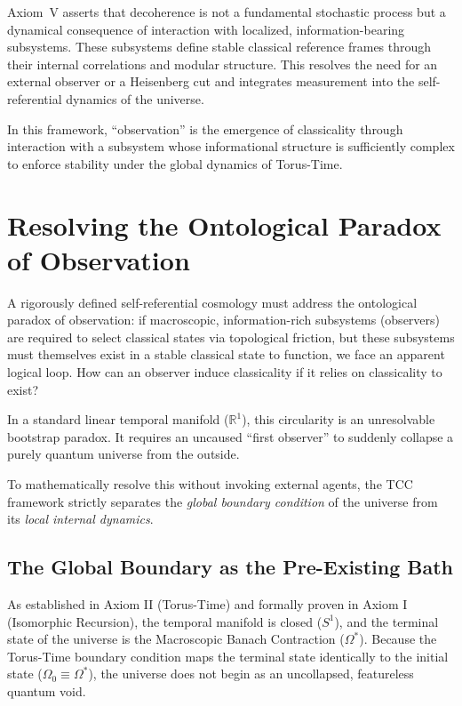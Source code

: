 \documentclass[12pt,openany]{book}
\theoremstyle{plain}
\theoremstyle{definition}
\theoremstyle{remark}
\begin{document}
Axiom~V asserts that decoherence is not a fundamental stochastic process but a
dynamical consequence of interaction with localized, information-bearing
subsystems. These subsystems define stable classical reference frames through
their internal correlations and modular structure. This resolves the need for
an external observer or a Heisenberg cut and integrates measurement into the
self-referential dynamics of the universe.

In this framework, ``observation'' is the emergence of classicality through
interaction with a subsystem whose informational structure is sufficiently
complex to enforce stability under the global dynamics of Torus-Time.

\section{Resolving the Ontological Paradox of Observation}

A rigorously defined self-referential cosmology must address the ontological paradox of observation: if macroscopic, information-rich subsystems (observers) are required to select classical states via topological friction, but these subsystems must themselves exist in a stable classical state to function, we face an apparent logical loop. How can an observer induce classicality if it relies on classicality to exist?

In a standard linear temporal manifold ($\mathbb{R}^1$), this circularity is an unresolvable bootstrap paradox. It requires an uncaused ``first observer'' to suddenly collapse a purely quantum universe from the outside.

To mathematically resolve this without invoking external agents, the TCC framework strictly separates the \emph{global boundary condition} of the universe from its \emph{local internal dynamics}. 

\subsection{The Global Boundary as the Pre-Existing Bath}

As established in Axiom II (Torus-Time) and formally proven in Axiom I (Isomorphic Recursion), the temporal manifold is closed ($S^1$), and the terminal state of the universe is the Macroscopic Banach Contraction ($\Omega^*$). Because the Torus-Time boundary condition maps the terminal state identically to the initial state ($\Omega_0 \equiv \Omega^*$), the universe does not begin as an uncollapsed, featureless quantum void. 
\end{document}
